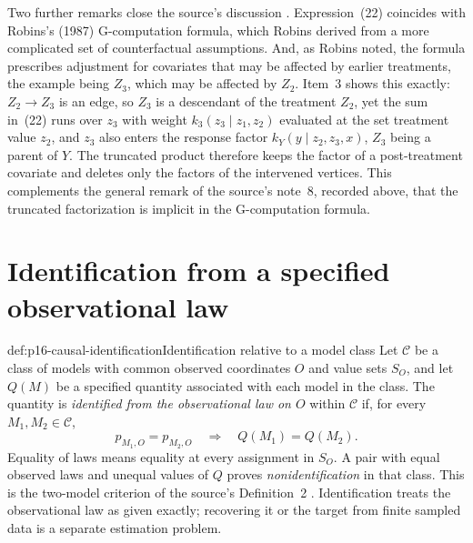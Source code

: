 Two further remarks close the source's discussion
\cite[sec.~3.2.3, pp.~112--113]{Pearl2009CausalOverview}. Expression~(22)
coincides with Robins's (1987) G-computation formula, which Robins
derived from a more complicated set of counterfactual assumptions. And,
as Robins noted, the formula prescribes adjustment for covariates that may
be affected by earlier treatments, the example being \(Z_3\), which may be
affected by \(Z_2\). Item~3 shows this exactly: \(Z_2\to Z_3\) is an
edge, so \(Z_3\) is a descendant of the treatment \(Z_2\), yet the sum
in~(22) runs over \(z_3\) with weight \(k_3(z_3\mid z_1,z_2)\) evaluated
at the set treatment value \(z_2\), and \(z_3\) also enters the response
factor \(k_Y(y\mid z_2,z_3,x)\), \(Z_3\) being a parent of \(Y\). The
truncated product therefore keeps the factor of a post-treatment covariate
and deletes only the factors of the intervened vertices. This complements
the general remark of the source's note~8, recorded above, that the
truncated factorization is implicit in the G-computation formula.

\section{Identification from a specified observational law}
\label{sec:p16-finite-causal-identification}

\begin{hbdefinition}{def:p16-causal-identification}{Identification relative to a model class}
Let \(\mathcal C\) be a class of models with common observed coordinates
\(O\) and value sets \(S_O\), and let \(Q(M)\) be a specified
quantity associated with each model in the class. The quantity is
\emph{identified from the observational law on \(O\)} within
\(\mathcal C\) if, for every \(M_1,M_2\in\mathcal C\),
\[
 p_{M_1,O}=p_{M_2,O}\quad\Longrightarrow\quad Q(M_1)=Q(M_2).
\]
Equality of laws means equality at every assignment in \(S_O\).
A pair with equal observed laws and unequal values of \(Q\) proves
\emph{nonidentification} in that class. This is the two-model criterion
of the source's Definition~2 \cite[p.~109]{Pearl2009CausalOverview}.
Identification treats the observational law as given exactly; recovering
it or the target from finite sampled data is a separate estimation problem.
\end{hbdefinition}

